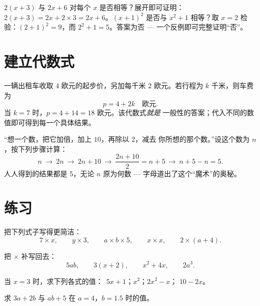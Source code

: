 \begin{example}\label{ex:g7:literal:test}
$2(x + 3)$ 与 $2x + 6$ 对每个 $x$ 是否相等？展开即可证明：
$2(x+3) = 2x + 2 \times 3 = 2x + 6$。$(x + 1)^2$ 是否与
$x^2 + 1$ 相等？取 $x = 2$ 检验：$(2+1)^2 = 9$，而 $2^2 + 1 = 5$。答案为否 ---
一个反例即可完整证明“否”。
\end{example}

\section{建立代数式}

\begin{example}[从情境到代数式]\label{ex:g7:literal:produce}
一辆出租车收取 $4$ 欧元的起步价，另加每千米 $2$ 欧元。若行程为
$k$ 千米，则车费为
\[
p = 4 + 2k \quad\text{欧元}.
\]
当 $k = 7$ 时，$p = 4 + 14 = 18$ 欧元。该代数式\emph{就是}
一般性的答案；代入不同的数值即可得到每一个具体结果。
\end{example}

\begin{example}[数字魔术]\label{ex:g7:literal:trick}
“想一个数，把它加倍，加上 $10$，再除以 $2$，减去
你所想的那个数。”设这个数为 $n$，按下列步骤计算：
\[
n \ \to\ 2n \ \to\ 2n + 10 \ \to\ \frac{2n + 10}{2} = n + 5 \ \to\
n + 5 - n = 5 .
\]
人人得到的结果都是 $5$，无论 $n$ 原为何数 ---
字母道出了这个“魔术”的奥秘。
\end{example}

\section{练习}

\begin{exercise}[$\star$]\label{exo:g7:literal:1}
把下列式子写得更简洁：
\[
7 \times x, \qquad
y \times 3, \qquad
a \times b \times 5, \qquad
x \times x, \qquad
2 \times (a + 4).
\]
\end{exercise}

\begin{exercise}[$\star$]\label{exo:g7:literal:2}
把 $\times$ 补写回去：
\[
5ab, \qquad
3(x + 2), \qquad
x^2 + 4x, \qquad
2a^3 .
\]
\end{exercise}

\begin{exercise}[$\star$]\label{exo:g7:literal:3}
当 $x = 3$ 时，求下列各式的值：\ $5x + 1$；\quad $x^2$；\quad $2x^2 - x$；
\quad $10 - 2x$。
\end{exercise}

\begin{exercise}[$\star$]\label{exo:g7:literal:4}
求 $3a + 2b$ 与 $a b + 5$ 在 $a = 4$，$b = 1.5$ 时的值。
\end{exercise}

